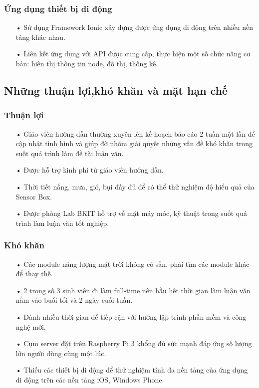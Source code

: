\subsubsection*{Ứng dụng thiết bị di động}
\begin{itemize}
\item[•] Sử dụng Framework Ionic xây dựng được ứng dụng di động trên nhiều nền tảng khác nhau.
\item[•] Liên kết ứng dụng với API được cung cấp, thực hiện một số chức năng cơ bản: hiên thị thông tin node, đồ thị, thống kê.
\end{itemize}

\subsection{Những thuận lợi,khó khăn và mặt hạn chế}
\subsubsection*{Thuận lợi}
\begin{itemize}
\item[•] Giáo viên hướng dẫn thường xuyên lên kế hoạch báo cáo 2 tuần một lần để cập nhật tình hình và giúp đỡ nhóm giải quyết những vấn đề khó khăn trong suốt quá trình làm đề tài luận văn.
\item[•] Được hỗ trợ kinh phí từ giáo viên hướng dẫn.
\item[•] Thời tiết nắng, mưa, gió, bụi đầy đủ để có thể thử nghiệm độ hiểu quả của Sensor Box.
\item[•] Được phòng Lab BKIT hỗ trợ về mặt máy móc, kỹ thuật trong suốt quá trình làm luận văn tốt nghiệp.
\end{itemize}

\subsubsection*{Khó khăn}
\begin{itemize}
\item[•] Các module năng lượng mặt trời không có sẵn, phải tìm các module khác để thay thế.
\item[•] 2 trong số 3 sinh viên đi làm full-time nên hầu hết thời gian làm luận văn nằm vào buổi tối và 2 ngày cuối tuần.
\item[•] Dành nhiều thời gian để tiếp cận với hướng lập trình phần mềm và công nghệ mới.
\item[•] Cụm server đặt trên Raspberry Pi 3 khổng đủ sức mạnh đáp ứng số lượng lớn người dùng cùng một lúc.
\item[•] Thiếu các thiết bị di động để thử nghiệm tính đa nền tảng của ứng dụng di động trên các nền tảng iOS, Windows Phone.
\end{itemize}
